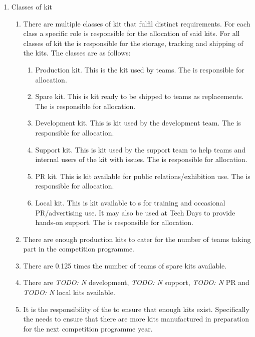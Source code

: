 \begin{enumerate}
\item Classes of kit
  \begin{enumerate}
    \item There are multiple classes of kit that fulfil distinct requirements. For each class a specific role is responsible for the allocation of said kits. For all classes of kit the  is responsible for the storage, tracking and shipping of the kits. The classes are as follows:
      \begin{enumerate}
        \item Production kit. This is the kit used by teams. The  is responsible for allocation.
        \item Spare kit. This is kit ready to be shipped to teams as replacements. The  is responsible for allocation.
        \item Development kit. This is kit used by the development team.  The  is responsible for allocation.
        \item Support kit. This is kit used by the support team to help teams and internal users of the kit with issues. The  is responsible for allocation.
        \item PR kit. This is kit available for public relations/exhibition use. The  is responsible for allocation.
        \item Local kit. This is kit available to s for training and occasional PR/advertising use. It may also be used at Tech Days to provide hands-on support. The  is responsible for allocation.
      \end{enumerate}
    \item There are enough production kits to cater for the number of teams taking part in the competition programme.
    \item There are 0.125 times the number of teams of spare kits available.
    \item There are \emph{TODO: N} development, \emph{TODO: N} support, \emph{TODO: N} PR and \emph{TODO: N} local kits available.
    \item It is the responsibility of the  to ensure that enough kits exist. Specifically the  needs to ensure that there are more kits manufactured in preparation for the next competition programme year.
  \end{enumerate}
\end{enumerate}
